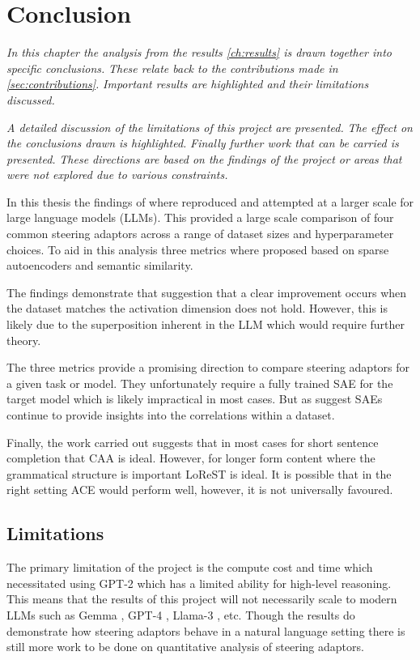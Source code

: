 \chapter{Conclusion}
\label{ch:conclusion}

\emph{In this chapter the analysis from the results \cref{ch:results} is drawn together into specific conclusions.}
\emph{These relate back to the contributions made in \cref{sec:contributions}.}
\emph{Important results are highlighted and their limitations discussed.}

\emph{A detailed discussion of the limitations of this project are presented.}
\emph{The effect on the conclusions drawn is highlighted.}
\emph{Finally further work that can be carried is presented.}
\emph{These directions are based on the findings of the project or areas that were not explored due to various constraints.}

In this thesis the findings of \citet{steering-clear} where reproduced and attempted at a larger scale for large language models (LLMs).
This provided a large scale comparison of four common steering adaptors across a range of dataset sizes and hyperparameter choices.
To aid in this analysis three metrics where proposed based on sparse autoencoders and semantic similarity.

The findings demonstrate that \cites{steering-clear} suggestion that a clear improvement occurs when the dataset matches the activation dimension does not hold.
However, this is likely due to the superposition inherent in the LLM which would require further theory.

The three metrics provide a promising direction to compare steering adaptors for a given task or model.
They unfortunately require a fully trained SAE for the target model which is likely impractical in most cases.
But as \citet{saes-bad} suggest SAEs continue to provide insights into the correlations within a dataset.

Finally, the work carried out suggests that in most cases for short sentence completion that CAA is ideal.
However, for longer form content where the grammatical structure is important LoReST is ideal.
It is possible that in the right setting ACE would perform well, however, it is not universally favoured.

\section{Limitations}

The primary limitation of the project is the compute cost and time which necessitated using GPT-2 which has a limited ability for high-level reasoning.
This means that the results of this project will not necessarily scale to modern LLMs such as Gemma \citep{gemma}, GPT-4 \citep{gpt-4}, Llama-3 \citep{llama3}, etc.
Though the results do demonstrate how steering adaptors behave in a natural language setting there is still more work to be done on quantitative analysis of steering adaptors.

